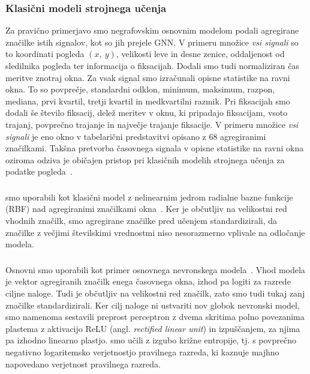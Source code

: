 \subsubsection*{Klasični modeli strojnega učenja}
\label{subsec:klasicni-modeli-strojnega-ucenja}

Za pravično primerjavo smo negrafovskim osnovnim modelom podali agregirane značilke istih signalov, kot so jih prejele GNN.
V primeru množice \emph{vsi signali} so to koordinati pogleda $(x,~y)$, velikosti leve in desne zenice, oddaljenost od sledilnika pogleda ter informacija o fiksacijah.
Dodali smo tudi normaliziran čas meritve znotraj okna.
Za vsak signal smo izračunali opisne statistike na ravni okna.
To so povprečje, standardni odklon, minimum, maksimum, razpon, mediana, prvi kvartil, tretji kvartil in medkvartilni razmik.
Pri fiksacijah smo dodali še število fiksacij, delež meritev v oknu, ki pripadajo fiksacijam, vsoto trajanj, povprečno trajanje in največje trajanje fiksacije.
V primeru množice \emph{vsi signali} je eno okno v tabelarični predstavitvi opisano z 68 agregiranimi značilkami.
Takšna pretvorba časovnega signala v opisne statistike na ravni okna oziroma odziva je običajen pristop pri klasičnih modelih strojnega učenja za podatke pogleda~\cite{bozak2024feature,lim2020emotion,tarnowski2020eye}.

\subsubsection*{}

 smo uporabili kot klasični model z nelinearnim jedrom radialne bazne funkcije (RBF) nad agregiranimi značilkami okna~\cite{cortes1995support}.
Ker je  občutljiv na velikostni red vhodnih značilk, smo agregirane značilke pred učenjem standardizirali, da značilke z večjimi številskimi vrednostmi niso nesorazmerno vplivale na odločanje modela.

\subsubsection*{}

Osnovni  smo uporabili kot primer osnovnega nevronskega modela~\cite{goodfellow2016deep}.
Vhod modela je vektor agregiranih značilk enega časovnega okna, izhod pa logiti za razrede ciljne naloge.
Tudi  je občutljiv na velikostni red značilk, zato smo tudi tukaj zanj značilke standardizirali.
Ker cilj naloge ni ustvariti nov globok nevronski model, smo namenoma sestavili preprost perceptron z dvema skritima polno povezanima plastema z aktivacijo ReLU (angl. \emph{rectified linear unit}) in izpuščanjem, za njima pa izhodno linearno plastjo.
 smo učili z izgubo križne entropije, tj. s povprečno negativno logaritemsko verjetnostjo pravilnega razreda, ki kaznuje majhno napovedano verjetnost pravilnega razreda.

